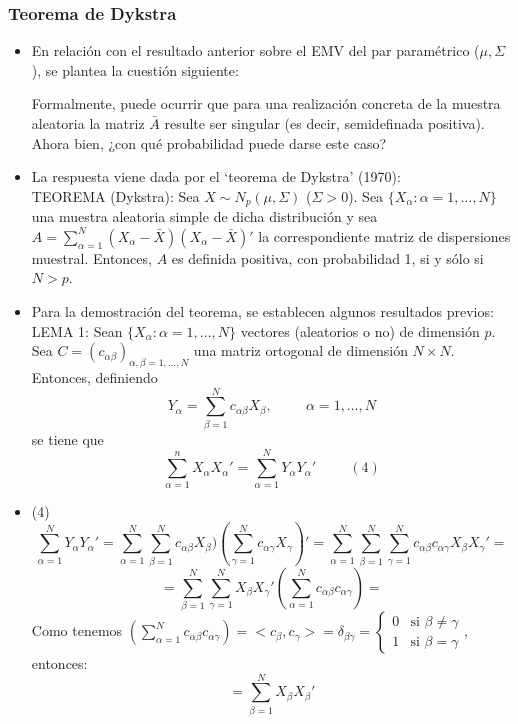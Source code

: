 \documentclass[11pt,a4paper]{article}
\begin{document}
\subsubsection{Teorema de Dykstra}
\begin{itemize}
\item En relación con el resultado anterior sobre el EMV del par paramétrico ($\mu, \Sigma$), se plantea la cuestión siguiente:

Formalmente, puede ocurrir que para una realización concreta de la muestra aleatoria la matriz $\bar{A}$ resulte ser singular (es decir, semidefinada positiva). Ahora bien, ¿con qué probabilidad puede darse este caso?

\item La respuesta viene dada por el `teorema de Dykstra' (1970): \\
TEOREMA (Dykstra): Sea $X \sim N_{p}(\mu, \Sigma)$ ($\Sigma > 0$). Sea $\{X_{\alpha}: \alpha=1,\dots,N\}$ una muestra aleatoria simple de dicha distribución y sea $A = \sum_{\alpha=1}^{N}(X_{\alpha} - \bar{X})(X_{\alpha}-\bar{X})'$ la correspondiente matriz de dispersiones muestral. Entonces, $A$ es definida positiva, con probabilidad 1, si y sólo si $N > p$.

\item Para la demostración del teorema, se establecen algunos resultados previos: \\
LEMA 1: Sean $\{X_{\alpha}: \alpha=1,\dots,N\}$ vectores (aleatorios o no) de dimensión $p$. Sea $C = (c_{\alpha\beta})_{\alpha,\beta=1,\dots,N}$ una matriz ortogonal de dimensión $N \times N$. Entonces, definiendo
$$Y_{\alpha} = \sum_{\beta=1}^{N} c_{\alpha\beta}X_{\beta}, \hspace{1cm} \alpha=1,\dots,N$$
se tiene que
$$\sum_{\alpha=1}^{n}X_{\alpha}X_{\alpha}' = \sum_{\alpha=1}^{N}Y_{\alpha}Y_{\alpha}' \hspace{1cm} (4)$$

\item (4) $$\sum_{\alpha=1}^{N} Y_{\alpha}Y_{\alpha}' = \sum_{\alpha=1}^{N} \sum_{\beta=1}^{N} c_{\alpha\beta}X_{\beta})(\sum_{\gamma=1}^{N} c_{\alpha\gamma}X_{\gamma})' = \sum_{\alpha=1}^{N} \sum_{\beta=1}^{N} \sum_{\gamma=1}^{N} c_{\alpha\beta} c_{\alpha\gamma} X_{\beta}X_{\gamma}' =$$
$$= \sum_{\beta=1}^{N} \sum_{\gamma=1}^{N} X_{\beta} X_{\gamma}' (\sum_{\alpha=1}^{N} c_{\alpha\beta} c_{\alpha\gamma}) =$$
Como tenemos $(\sum_{\alpha=1}^{N} c_{\alpha\beta} c_{\alpha\gamma}) = <c_{\beta}, c_{\gamma}> = \delta_{\beta\gamma} = \begin{cases}
0 & \text{si } \beta \neq \gamma \\
1 & \text{si } \beta = \gamma
\end{cases}$, entonces:
$$= \sum_{\beta=1}^{N} X_{\beta}X_{\beta}'$$


\end{itemize}
\end{document}
